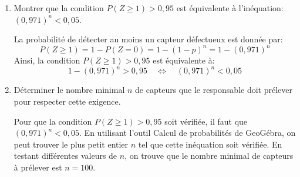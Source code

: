 \documentclass[11pt, a4paper]{report}
\begin{document}
\begin{enumerate}[resume]
    \item Montrer que la condition $P(Z \geq 1) > 0,95$ est équivalente à l'inéquation: ${(0,971)}^n < 0,05$.
    \begin{blocvisible}[height=4]
        La probabilité de détecter au moins un capteur défectueux est donnée par:   
\[P(Z \geq 1) = 1 - P(Z = 0) = 1 - {(1-p)}^n = 1 - {(0,971)}^n\]
Ainsi, la condition $P(Z \geq 1) > 0,95$ est équivalente à:
\[1 - {(0,971)}^n > 0,95 \quad \Leftrightarrow \quad {(0,971)}^n < 0,05\]
    \end{blocvisible}
    \medskip
    \item Déterminer le nombre minimal $n$ de capteurs que le responsable doit prélever pour respecter cette exigence.
    \begin{blocvisible}[height=2.8]
        Pour que la condition $P(Z \geq 1) > 0,95$ soit vérifiée, il faut que ${(0,971)}^n < 0,05$. En utilisant l'outil \og{}Calcul de probabilités\fg{} de GeoGébra, on peut trouver le plus petit entier $n$ tel que cette inéquation soit vérifiée. En testant différentes valeurs de $n$, on trouve que le nombre minimal de capteurs à prélever est $n = 100$.
    \end{blocvisible}

    \appelprof{}
\end{enumerate}
\end{document}
